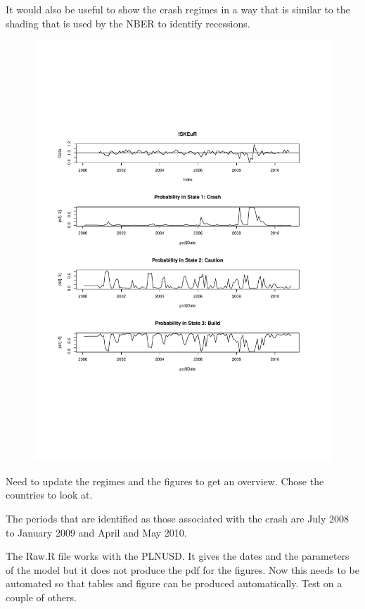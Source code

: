 \documentclass[12pt, a4paper, oneside]{article} %
\begin{document}
It would also be useful to show the crash regimes in a way that is similar to the shading that is used by the NBER to identify recessions.   

 
\begin{figure}
\centering
\includegraphics[scale = .80]{ISKEUR.pdf}
\end{figure}

Need to update the regimes and the figures to get an overview.  Chose the countries to look at. 

The periods that are identified as those associated with the crash are July 2008 to January 2009 and April and May 2010.  

The Raw.R file works with the PLNUSD.  It gives the dates and the parameters of the model but it does not produce the pdf for the figures. Now this needs to be automated so that tables and figure can be produced automatically. Test on a couple of others. 
\end{document}
